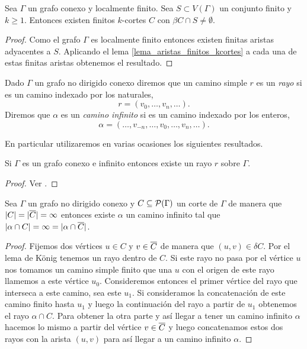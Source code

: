 \documentclass[tesis.tex]{subfiles}
\begin{document}
\begin{coro}\label{lema_finitos_kcortes}
	Sea $\Gamma$ un grafo conexo y localmente finito.
	Sea $S \subset V(\Gamma)$ un conjunto finito y $k\ge 1$.
	Entonces existen finitos $k$-cortes $C$ con $\beta C \cap S \neq \emptyset$.
\end{coro}	

\begin{proof}
	Como el grafo $\Gamma$ es localmente finito entonces existen finitas aristas adyacentes a $S$.
	Aplicando el lema \ref{lema_aristas_finitos_kcortes} a cada una de estas finitas aristas obtenemos el resultado.	
\end{proof}
	

\begin{deff}
	Dado $\Gamma$ un grafo no dirigido conexo diremos que un camino simple $r$ es un \emph{rayo} si es un camino indexado por los naturales,
	\[
	r = (v_0, \dots, v_{n}, \dots).
	\]	
	Diremos que $\alpha$ es un \emph{camino infinito} si es un camino indexado por los enteros,
	\[
	\alpha = ( \dots, v_{-n}, \dots, v_0, \dots, v_{n}, \dots ).
	\]
\end{deff}		


En particular utilizaremos en varias ocasiones los siguientes resultados.


\begin{lema}[König]
	Si $\Gamma$ es un grafo conexo e infinito entonces existe un rayo $r$ sobre $\Gamma$.
\end{lema}
\begin{proof}
	Ver \cite{diestel2005graph}.
\end{proof}


\begin{lema}
	Sea $\Gamma$ un grafo no dirigido conexo y $C \subseteq {\cal P}(\Gamma)$ un corte de $\Gamma$ de manera que $|C| = |\overline C| = \infty$ entonces existe $\alpha$ un camino infinito tal que 
	$|\alpha \cap C| = \infty = |\alpha \cap \overline C|$.
\end{lema}

\begin{proof}
	Fijemos dos vértices $u \in C$ y $v \in \overline C$ de manera que $(u,v) \in \delta C$.
	Por el lema de König  tenemos un rayo dentro de $C$.
	Si este rayo no pasa por el vértice $u$ nos tomamos un camino simple finito que una $u$ con el origen de este rayo llamemos a este vértice $u_{0}$.
	Consideremos entonces el primer vértice del rayo que interseca a este camino, sea este $u_{1}$.
	Si consideramos la concatenación de este camino finito hasta $u_{1}$ y luego la continuación del rayo a partir de $u_{1}$ obtenemos el rayo $\alpha \cap C$.
	Para obtener la otra parte y así llegar a tener un camino infinito $\alpha$ hacemos lo mismo a partir del vértice $v \in \overline C$ y luego concatenamos estos dos rayos con la arista $(u,v)$ para así llegar a un camino infinito $\alpha$. 
\end{proof}
\end{document}
